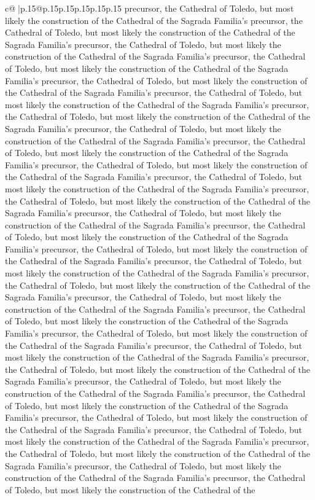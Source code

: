 \documentclass{article}
\begin{document}
{\begin{supertabular}{c@{$\;$}|p{.15\linewidth}@{}p{.15\linewidth}p{.15\linewidth}p{.15\linewidth}p{.15\linewidth}p{.15\linewidth}}
{{{precursor, the Cathedral of Toledo, but most likely the construction of the Cathedral of the Sagrada Familia's precursor, the Cathedral of Toledo, but most likely the construction of the Cathedral of the Sagrada Familia's precursor, the Cathedral of Toledo, but most likely the construction of the Cathedral of the Sagrada Familia's precursor, the Cathedral of Toledo, but most likely the construction of the Cathedral of the Sagrada Familia's precursor, the Cathedral of Toledo, but most likely the construction of the Cathedral of the Sagrada Familia's precursor, the Cathedral of Toledo, but most likely the construction of the Cathedral of the Sagrada Familia's precursor, the Cathedral of Toledo, but most likely the construction of the Cathedral of the Sagrada Familia's precursor, the Cathedral of Toledo, but most likely the construction of the Cathedral of the Sagrada Familia's precursor, the Cathedral of Toledo, but most likely the construction of the Cathedral of the Sagrada Familia's precursor, the Cathedral of Toledo, but most likely the construction of the Cathedral of the Sagrada Familia's precursor, the Cathedral of Toledo, but most likely the construction of the Cathedral of the Sagrada Familia's precursor, the Cathedral of Toledo, but most likely the construction of the Cathedral of the Sagrada Familia's precursor, the Cathedral of Toledo, but most likely the construction of the Cathedral of the Sagrada Familia's precursor, the Cathedral of Toledo, but most likely the construction of the Cathedral of the Sagrada Familia's precursor, the Cathedral of Toledo, but most likely the construction of the Cathedral of the Sagrada Familia's precursor, the Cathedral of Toledo, but most likely the construction of the Cathedral of the Sagrada Familia's precursor, the Cathedral of Toledo, but most likely the construction of the Cathedral of the Sagrada Familia's precursor, the Cathedral of Toledo, but most likely the construction of the Cathedral of the Sagrada Familia's precursor, the Cathedral of Toledo, but most likely the construction of the Cathedral of the Sagrada Familia's precursor, the Cathedral of Toledo, but most likely the construction of the Cathedral of the Sagrada Familia's precursor, the Cathedral of Toledo, but most likely the construction of the Cathedral of the Sagrada Familia's precursor, the Cathedral of Toledo, but most likely the construction of the Cathedral of the Sagrada Familia's precursor, the Cathedral of Toledo, but most likely the construction of the Cathedral of the Sagrada Familia's precursor, the Cathedral of Toledo, but most likely the construction of the Cathedral of the Sagrada Familia's precursor, the Cathedral of Toledo, but most likely the construction of the Cathedral of the Sagrada Familia's precursor, the Cathedral of Toledo, but most likely the construction of the Cathedral of the Sagrada Familia's precursor, the Cathedral of Toledo, but most likely the construction of the Cathedral of the Sagrada Familia's precursor, the Cathedral of Toledo, but most likely the construction of the Cathedral of the Sagrada Familia's precursor, the Cathedral of Toledo, but most likely the construction of the Cathedral of the }}}
\end{supertabular}}
\end{document}
